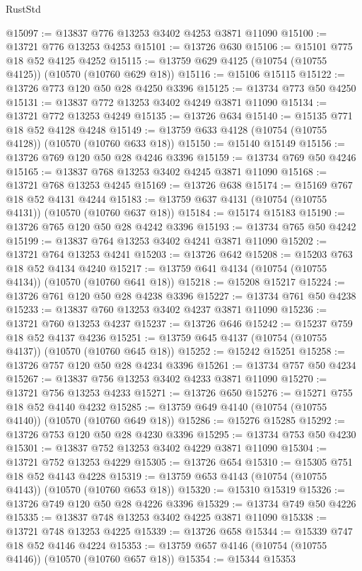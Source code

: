 \begin{lexlean}{RustStd}
\begin{coremodule}
@15097 := @13837 @776 @13253 @3402 @4253 @3871 @11090
@15100 := @13721 @776 @13253 @4253
@15101 := @13726 @630
@15106 := @15101 @775 @18 @52 @4125 @4252
@15115 := @13759 @629 @4125 (@10754 (@10755 @4125)) (@10570 (@10760 @629 @18))
@15116 := @15106 @15115
@15122 := @13726 @773 @120 @50 @28 @4250 @3396
@15125 := @13734 @773 @50 @4250
@15131 := @13837 @772 @13253 @3402 @4249 @3871 @11090
@15134 := @13721 @772 @13253 @4249
@15135 := @13726 @634
@15140 := @15135 @771 @18 @52 @4128 @4248
@15149 := @13759 @633 @4128 (@10754 (@10755 @4128)) (@10570 (@10760 @633 @18))
@15150 := @15140 @15149
@15156 := @13726 @769 @120 @50 @28 @4246 @3396
@15159 := @13734 @769 @50 @4246
@15165 := @13837 @768 @13253 @3402 @4245 @3871 @11090
@15168 := @13721 @768 @13253 @4245
@15169 := @13726 @638
@15174 := @15169 @767 @18 @52 @4131 @4244
@15183 := @13759 @637 @4131 (@10754 (@10755 @4131)) (@10570 (@10760 @637 @18))
@15184 := @15174 @15183
@15190 := @13726 @765 @120 @50 @28 @4242 @3396
@15193 := @13734 @765 @50 @4242
@15199 := @13837 @764 @13253 @3402 @4241 @3871 @11090
@15202 := @13721 @764 @13253 @4241
@15203 := @13726 @642
@15208 := @15203 @763 @18 @52 @4134 @4240
@15217 := @13759 @641 @4134 (@10754 (@10755 @4134)) (@10570 (@10760 @641 @18))
@15218 := @15208 @15217
@15224 := @13726 @761 @120 @50 @28 @4238 @3396
@15227 := @13734 @761 @50 @4238
@15233 := @13837 @760 @13253 @3402 @4237 @3871 @11090
@15236 := @13721 @760 @13253 @4237
@15237 := @13726 @646
@15242 := @15237 @759 @18 @52 @4137 @4236
@15251 := @13759 @645 @4137 (@10754 (@10755 @4137)) (@10570 (@10760 @645 @18))
@15252 := @15242 @15251
@15258 := @13726 @757 @120 @50 @28 @4234 @3396
@15261 := @13734 @757 @50 @4234
@15267 := @13837 @756 @13253 @3402 @4233 @3871 @11090
@15270 := @13721 @756 @13253 @4233
@15271 := @13726 @650
@15276 := @15271 @755 @18 @52 @4140 @4232
@15285 := @13759 @649 @4140 (@10754 (@10755 @4140)) (@10570 (@10760 @649 @18))
@15286 := @15276 @15285
@15292 := @13726 @753 @120 @50 @28 @4230 @3396
@15295 := @13734 @753 @50 @4230
@15301 := @13837 @752 @13253 @3402 @4229 @3871 @11090
@15304 := @13721 @752 @13253 @4229
@15305 := @13726 @654
@15310 := @15305 @751 @18 @52 @4143 @4228
@15319 := @13759 @653 @4143 (@10754 (@10755 @4143)) (@10570 (@10760 @653 @18))
@15320 := @15310 @15319
@15326 := @13726 @749 @120 @50 @28 @4226 @3396
@15329 := @13734 @749 @50 @4226
@15335 := @13837 @748 @13253 @3402 @4225 @3871 @11090
@15338 := @13721 @748 @13253 @4225
@15339 := @13726 @658
@15344 := @15339 @747 @18 @52 @4146 @4224
@15353 := @13759 @657 @4146 (@10754 (@10755 @4146)) (@10570 (@10760 @657 @18))
@15354 := @15344 @15353

\end{coremodule}
\end{lexlean}
